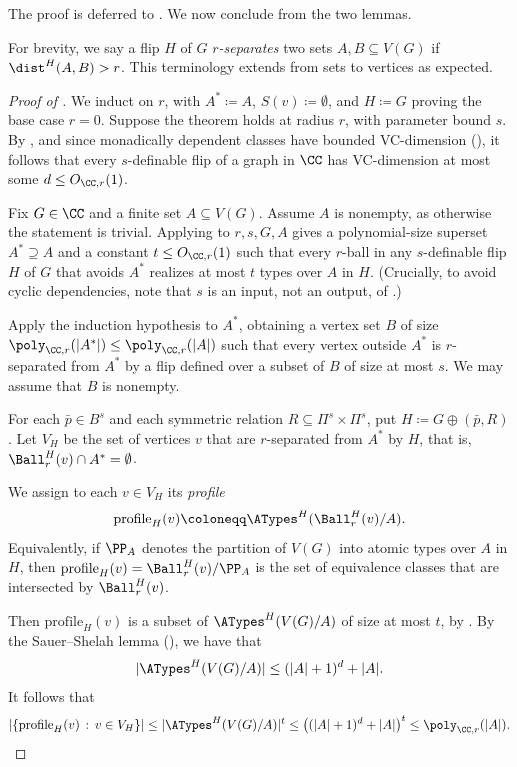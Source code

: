 The proof is deferred to . We now conclude  from the two lemmas.

\thmClosures*

For brevity, we say a flip $H$ of $G$ \emph{$r$-separates} two sets $A, B\subseteq V(G)$ if $\dist^H(A,B)>r$.
This terminology extends from sets to vertices as expected.

\begin{proof}[Proof of ]
    We induct on $r$, with $A^*\coloneqq A$, $S(v)\coloneqq \emptyset$, and $H\coloneqq G$ proving the base case $r=0$.
    Suppose the theorem holds at radius $r$, with parameter bound $s$.
    By , and since monadically dependent classes have bounded VC-dimension (), it follows that
    every $s$-definable flip of a graph in $\CC$ has VC-dimension at most some $d\leq O_{\CC,r}(1)$.

    Fix $G\in\CC$ and a finite set $A\subseteq V(G)$. Assume $A$ is nonempty, as otherwise the statement is trivial.
    Applying  to $r,s,G,A$ gives a polynomial-size superset $A^*\supseteq A$ and a constant $t \leq O_{\CC,r}(1)$ such that every $r$-ball in any $s$-definable flip $H$ of $G$ that avoids $A^*$ realizes at most $t$ types over $A$ in $H$.
    (Crucially, to avoid cyclic dependencies, note that $s$ is an input, not an output, of .)

    Apply the induction hypothesis to $A^*$, obtaining a vertex set $B$ of size $\poly_{\CC,r}(|A^*|)\leq\poly_{\CC,r}(|A|)$ such that every vertex outside $A^*$ is $r$-separated from $A^*$ by a flip defined over a subset of $B$ of size at most $s$. We may assume that $B$ is nonempty.

    For each $\bar p\in B^s$ and each symmetric relation $R\subseteq\Pi^{s}\times\Pi^{s}$, put $H\coloneqq G\oplus(\bar p,R)$.
    Let $V_H$ be the set of vertices $v$ that are $r$-separated from $A^*$ by $H$, that is, $\Ball_r^H(v)\cap A^*=\emptyset$.

    We assign to each $v \in V_H$ its \emph{profile}
    \[
        \mathrm{profile}_H(v) \coloneqq \ATypes^H(\Ball_r^H(v)/A).
    \]
Equivalently,
if  $\PP_A$ denotes the partition of $V(G)$ into atomic types over $A$ in $H$,
then $\mathrm{profile}_H(v)=
\Ball_r^H(v)/\PP_A$
is the set of equivalence classes that are intersected by $\Ball_r^H(v)$.

Then $\mathrm{profile}_H(v)$
is a subset of $\ATypes^H(V(G)/ A)$ of size at most $t$,
by .
By the Sauer--Shelah lemma (), we have that
\[
    |\ATypes^H(V(G)/ A)|\leq (|A|+1)^d+|A|.
\]
It follows that
    \[
        |\{\mathrm{profile}_H(v) \,:\, v \in V_H\}|
        \leq
        |\ATypes^H(V(G)/ A)|^t \leq \big((|A|+1)^d+|A|\big)^t
        \leq
        \poly_{\CC,r}(|A|).
    \]


\end{proof}
